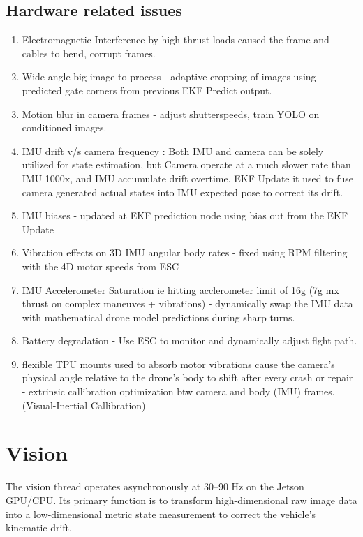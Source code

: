 \documentclass{article}
\begin{document}
\subsection{Hardware related issues}
\begin{enumerate}
    \item Electromagnetic Interference by high thrust loads caused the frame and cables to bend, corrupt frames.
    \item  Wide-angle big image to process - adaptive cropping of images using predicted gate corners from previous EKF Predict output.
    \item Motion blur in camera frames - adjust shutterspeeds, train YOLO on conditioned images.
    \item IMU drift v/s camera frequency : Both IMU and camera can be solely utilized for state estimation, but Camera operate at a much slower rate than IMU 1000x, and IMU accumulate drift overtime. EKF Update it used to fuse camera generated actual states into IMU expected pose to correct its drift.
    \item IMU biases - updated at EKF prediction node using bias out from the EKF Update
    \item Vibration effects on 3D IMU angular body rates - fixed using RPM filtering with the 4D motor speeds from ESC
    \item IMU Accelerometer Saturation ie hitting acclerometer limit of 16g (7g mx thrust on complex maneuves + vibrations) - dynamically swap the IMU data with mathematical drone model predictions during sharp turns.
    \item Battery degradation - Use ESC to monitor and dynamically adjust flght path.
    \item flexible TPU mounts used to absorb motor vibrations cause the camera's physical angle relative to the drone's body to shift after every crash or repair - extrinsic callibration optimization btw camera and body (IMU) frames. (Visual-Inertial Callibration)
\end{enumerate}


\section{Vision}
The vision thread operates asynchronously at 30--90 Hz on the Jetson GPU/CPU. Its primary function is to transform high-dimensional raw image data into a low-dimensional metric state measurement to correct the vehicle's kinematic drift.
\end{document}
